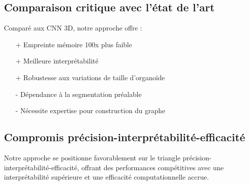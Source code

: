 \subsection{Comparaison critique avec l'état de l'art}

Comparé aux CNN 3D, notre approche offre :
\begin{itemize}
    \item [+] Empreinte mémoire 100x plus faible
    \item [+] Meilleure interprétabilité
    \item [+] Robustesse aux variations de taille d'organoïde
    \item [-] Dépendance à la segmentation préalable
    \item [-] Nécessite expertise pour construction du graphe
\end{itemize}

\subsection{Compromis précision-interprétabilité-efficacité}

Notre approche se positionne favorablement sur le triangle précision-interprétabilité-efficacité, offrant des performances compétitives avec une interprétabilité supérieure et une efficacité computationnelle accrue.
